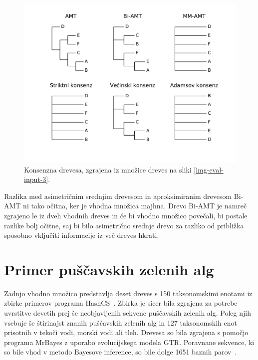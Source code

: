 \documentclass[a4paper, 12pt]{book}
\begin{document}
\begin{figure}
	\begin{center}
		\includegraphics[scale=0.6, clip=true, trim=1.5cm 1.5cm 1cm 0.8cm]{gfx/eval_gfx_3.pdf}
	\end{center}
	\caption{Konsenzna drevesa, zgrajena iz množice dreves na sliki \ref{img-eval-input-3}.}
	\label{img-eval-result-3}
\end{figure}

Razlika med asimetričnim srednjim drevesom in aproksimiranim drevesom Bi-AMT ni 
tako očitna, ker je vhodna množica majhna. Drevo Bi-AMT je namreč zgrajeno le 
iz dveh vhodnih dreves in če bi vhodno množico povečali, bi postale razlike 
bolj očitne, saj bi bilo asimetrično srednje drevo za razliko od približka sposobno
vključiti informacije iz več dreves hkrati.

\section{Primer puščavskih zelenih alg}
Zadnjo vhodno množico predstavlja deset dreves s 150 taksonomskimi enotami iz 
zbirke primerov programa HashCS~\cite{hashcs}. Zbirka je sicer bila zgrajena 
za potrebe uvrstitve devetih prej še neobjavljenih sekvenc puščavskih zelenih alg.
Poleg njih vsebuje še štirinajst znanih puščavskih zelenih alg in 127 taksonomskih 
enot prisotnih v tekoči vodi, morski vodi ali tleh. Drevesa so bila zgrajena s 
pomočjo programa MrBayes z uporabo evolucijskega modela GTR. Poravnane sekvence, 
ki so bile vhod v metodo Bayesove inference, so bile dolge 1651 baznih parov~\cite{taxa150}.
\end{document}
